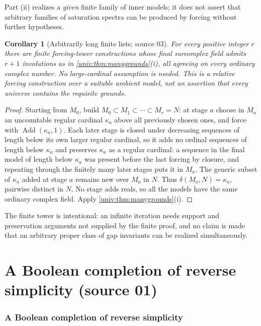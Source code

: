 \documentclass[11pt,letterpaper]{article}
\numberwithin{equation}{section}
\newtheorem{corollary}[corollary]{Corollary}
\theoremstyle{definition}
\theoremstyle{remark}
\newcommand{\Add}{\operatorname{Add}}
\begin{document}
Part (ii) realizes a \emph{given} finite family of inner models; it does not
assert that arbitrary families of saturation spectra can be produced by
forcing without further hypotheses.

\begin{corollary}[Arbitrarily long finite lists; source 03]\label{univ:cor:finitetower}
For every positive integer $r$ there are finite forcing-tower constructions
whose final surcomplex field admits $r+1$ involutions as in
\cref{univ:thm:manygrounds}(i), all agreeing on every ordinary complex number.
No large-cardinal assumption is needed. This is a relative forcing
construction over a suitable ambient model, not an assertion that every
universe contains the requisite grounds.
\end{corollary}
\begin{proof}
Starting from $M_0$, build $M_0\subset M_1\subset\cdots\subset M_r=N$: at stage
$a$ choose in $M_a$ an uncountable regular cardinal $\kappa_a$ above all
previously chosen ones, and force with $\Add(\kappa_a,1)$. Each later stage is
closed under decreasing sequences of length below its own larger regular
cardinal, so it adds no ordinal sequences of length below $\kappa_a$ and
preserves $\kappa_a$ as a regular cardinal: a sequence in the final model of
length below $\kappa_a$ was present before the last forcing by closure, and
repeating through the finitely many later stages puts it in $M_a$. The generic
subset of $\kappa_a$ added at stage $a$ remains new over $M_a$ in $N$. Thus
$\delta(M_a,N)=\kappa_a$, pairwise distinct in $N$. No stage adds reals, so all
the models have the same ordinary complex field. Apply
\cref{univ:thm:manygrounds}(i).
\end{proof}

The finite tower is intentional: an infinite iteration needs support and
preservation arguments not supplied by the finite proof, and no claim is made
that an arbitrary proper class of gap invariants can be realized
simultaneously.

\part{A Boolean completion of reverse simplicity (source 01)}\label{univ:part:boolean}

\section{A Boolean completion of reverse simplicity}\label{univ:sec:boolean}
\end{document}
